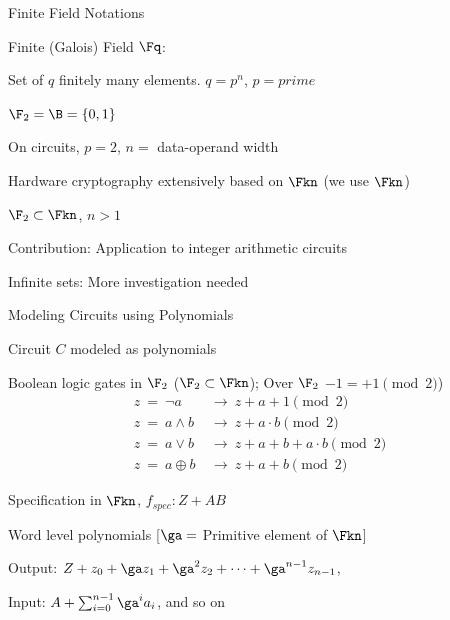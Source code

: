 \begin{frame}{\large Finite Field Notations}
	\bi
		\item Finite (Galois) Field $\Fq$: 
		\bi
			\item Set of $q$ finitely many elements. $q=p^n$, $p=prime$
		\ei
		\item $\F_2 = \B = \{0,1\}$
		\item On circuits, $p=2$, $n=$ data-operand width 
		\item Hardware cryptography extensively based on $\Fkn$ (we use $\Fkn$)
		\item $\F_2 \subset \Fkn$, $n>1$
		\item Contribution: Application to integer arithmetic circuits
		\bi
			\item Infinite sets: More investigation needed 
		\ei
	\ei
\end{frame}

\begin{frame}{\large Modeling Circuits using Polynomials}
\bi
\item Circuit $C$ modeled as polynomials
\item Boolean logic gates in $\F_2$ ($\F_2 \subset \Fkn$); Over $\F_2$ $-1 = +1 \pmod{2}$)
\begin{align*}
z ~ =  ~ \neg a ~ & \rightarrow ~ z+a+1 \pmod 2  \\
z ~ =  ~ a \wedge b ~ & \rightarrow ~ z+a\cdot b \pmod 2\\
z ~ =  ~ a \vee b ~ & \rightarrow ~ z+a+b+a\cdot b \pmod 2 \\
z ~ =  ~ a \oplus b ~ & \rightarrow ~ z+a+b \pmod 2 
\end{align*}
\item Specification in $\Fkn$, $f_{spec}:Z+AB$
\item Word level polynomials [$\ga=$ Primitive element of $\Fkn$]
\bi
	\item Output: $Z + z_0 +\ga z_1 +\ga^2 z_2 + \cdots +\ga^{n-1} z_{n-1}$,
	\item Input: $A + \sum_{i=0}^{n-1}\ga^ia_i$, and so on
\ei 
\ei
\end{frame}

